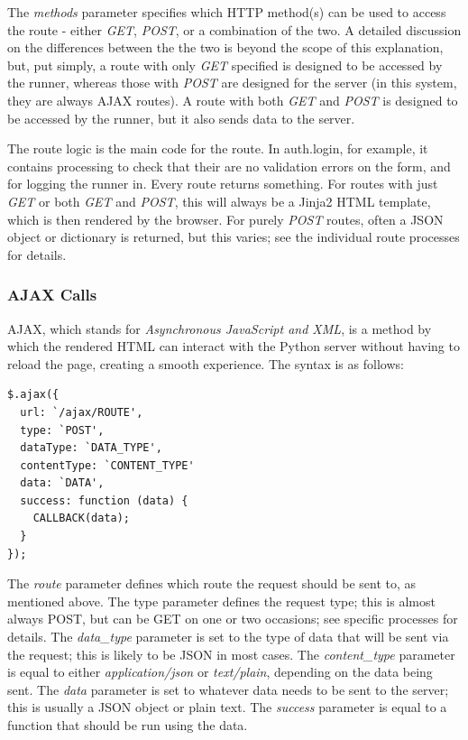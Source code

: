 \documentclass{article}[12pt,a4paper]
\begin{document}
The \textit{methods} parameter specifies which HTTP method(s) can be used to access the route - either \textit{GET}, \textit{POST}, or a combination of the two. A detailed discussion on the differences between the the two is beyond the scope of this explanation, but, put simply, a route with only \textit{GET} specified is designed to be accessed by the runner, whereas those with \textit{POST} are designed for the server (in this system, they are always AJAX routes). A route with both \textit{GET} and \textit{POST} is designed to be accessed by the runner, but it also sends data to the server.

The route logic is the main code for the route. In auth.login, for example, it contains processing to check that their are no validation errors on the form, and for logging the runner in. Every route returns something. For routes with just \textit{GET} or both \textit{GET} and \textit{POST}, this will always be a Jinja2 HTML template, which is then rendered by the browser. For purely \textit{POST} routes, often a JSON object or dictionary is returned, but this varies; see the individual route processes for details.

\subsubsection{AJAX Calls}
AJAX, which stands for \textit{Asynchronous JavaScript and XML}, is a method by which the rendered HTML can interact with the Python server without having to reload the page, creating a smooth experience. The syntax is as follows:

\begin{verbatim}
$.ajax({
  url: `/ajax/ROUTE',
  type: `POST',
  dataType: `DATA_TYPE',
  contentType: `CONTENT_TYPE'
  data: `DATA',
  success: function (data) {
    CALLBACK(data);
  }
});
\end{verbatim}
The \textit{route} parameter defines which route the request should be sent to, as mentioned above. The 
type parameter defines the request type; this is almost always POST, but can be GET on one or two occasions; see specific processes for details. The \textit{data\_type} parameter is set to the type of data that will be sent via the request; this is likely to be JSON in most cases. The \textit{content\_type} parameter is equal to either \textit{application/json} or \textit{text/plain}, depending on the data being sent. The \textit{data} parameter is set to whatever data needs to be sent to the server; this is usually a JSON object or plain text. The \textit{success} parameter is equal to a function that should be run using the data.
\end{document}
